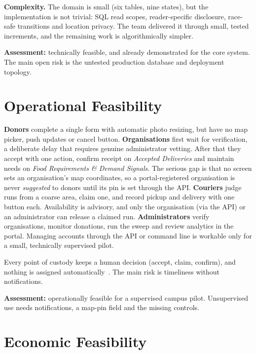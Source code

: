 \textbf{Complexity.} The domain is small (six tables, nine states), but the
implementation is not trivial: SQL read scopes, reader-specific disclosure,
race-safe transitions and location privacy. The team delivered it through small,
tested increments, and the remaining work is algorithmically simpler.

\textbf{Assessment:} technically feasible, and already demonstrated for the core
system. The main open risk is the untested production database and deployment
topology.

\section{Operational Feasibility}
\label{sec:feas-operational}

\textbf{Donors} complete a single form with automatic photo resizing, but have
no map picker, push updates or cancel button. \textbf{Organisations} first wait
for verification, a deliberate delay that requires genuine administrator
vetting. After that they accept with one action, confirm receipt on
\emph{Accepted Deliveries} and maintain needs on \emph{Food Requirements \&
Demand Signals}. The serious gap is that no screen sets an organisation's map
coordinates, so a portal-registered organisation is never \emph{suggested} to
donors until its pin is set through the API. \textbf{Couriers} judge runs from a
coarse area, claim one, and record pickup and delivery with one button each.
Availability is advisory, and only the organisation (via the API) or an
administrator can release a claimed run. \textbf{Administrators} verify
organisations, monitor donations, run the sweep and review analytics in the
portal. Managing accounts through the API or command line is workable only for a
small, technically supervised pilot.

Every point of custody keeps a human decision (accept, claim, confirm), and
nothing is assigned automatically~\cite{foodlinkProposal}. The main risk is
timeliness without notifications.

\textbf{Assessment:} operationally feasible for a supervised campus pilot.
Unsupervised use needs notifications, a map-pin field and the missing controls.

\section{Economic Feasibility}
\label{sec:feas-economic}

